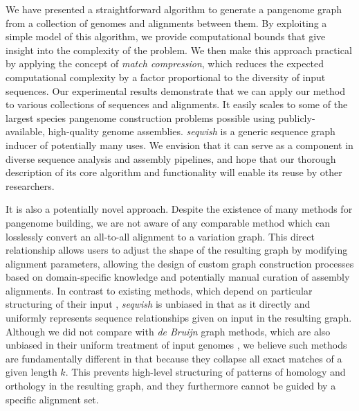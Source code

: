 \documentclass{bioinfo}
\theoremstyle{definition}
\begin{document}
We have presented a straightforward algorithm to generate a pangenome graph from a collection of genomes and alignments between them.
By exploiting a simple model of this algorithm, we provide computational bounds that give insight into the complexity of the problem.
We then make this approach practical by applying the concept of \textit{match compression}, which reduces the expected computational complexity by a factor proportional to the diversity of input sequences.
Our experimental results demonstrate that we can apply our method to various collections of sequences and alignments.
It easily scales to some of the largest species pangenome construction problems possible using publicly-available, high-quality genome assemblies.
\textit{seqwish} is a generic sequence graph inducer of potentially many uses.
We envision that it can serve as a component in diverse sequence analysis and assembly pipelines, and hope that our thorough description of its core algorithm and functionality will enable its reuse by other researchers.

It is also a potentially novel approach.
Despite the existence of many methods for pangenome building, we are not aware of any comparable method which can losslessly convert an all-to-all alignment to a variation graph.
This direct relationship allows users to adjust the shape of the resulting graph by modifying alignment parameters, allowing the design of custom graph construction processes based on domain-specific knowledge and potentially manual curation of assembly alignments.
In contrast to existing methods, which depend on particular structuring of their input \citep{Li:2020,Armstrong:2020}, \textit{seqwish} is unbiased in that as it directly and uniformly represents sequence relationships given on input in the resulting graph.
Although we did not compare with \textit{de Bruijn} graph methods, which are also unbiased in their uniform treatment of input genomes \citep{Minkin_2016,Yu_2021}, we believe such methods are fundamentally different in that because they collapse all exact matches of a given length $k$.
This prevents high-level structuring of patterns of homology and orthology in the resulting graph, and they furthermore cannot be guided by a specific alignment set.
\end{document}
